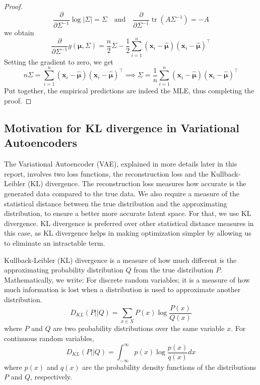 \begin{proof}
    \[
    \frac{\partial}{\partial \Sigma^{-1}} \log |\Sigma| = \Sigma
    \quad \text{and} \quad
    \frac{\partial}{\partial \Sigma^{-1}} \operatorname{tr}(A\Sigma^{-1}) = -A
    \]
    we obtain
    \[
    \frac{\partial}{\partial \Sigma^{-1}} g(\boldsymbol{\mu},\Sigma) = \frac{n}{2}\Sigma - \frac{1}{2}\sum_{i=1}^n (\mathbf{x}_i - \hat{\boldsymbol{\mu}})(\mathbf{x}_i - \hat{\boldsymbol{\mu}})^\top
    \]
    Setting the gradient to zero, we get
    \[
    n\Sigma = \sum_{i=1}^n (\mathbf{x}_i - \hat{\boldsymbol{\mu}})(\mathbf{x}_i - \hat{\boldsymbol{\mu}})^\top
    \implies
    \Sigma = \frac{1}{n} \sum_{i=1}^n (\mathbf{x}_i - \hat{\boldsymbol{\mu}})(\mathbf{x}_i - \hat{\boldsymbol{\mu}})^\top
    \]
    Put together, the empirical predictions are indeed the MLE, thus completing the proof.
\end{proof}

\subsection{Motivation for KL divergence in Variational Autoencoders}
The Variational Autoencoder (VAE), explained in more details later in this report, involves two loss functions, the reconstruction loss and the Kullback-Leibler (KL) divergence. The reconstruction loss measures how accurate is the generated data compared to the true data. We also require a measure of the statistical distance between the true distribution and the approximating distribution, to ensure a better more accurate latent space. For that, we use KL divergence.
KL divergence is preferred over other statistical distance measures in this case, as KL divergence helps in making optimization simpler by allowing us to eliminate an intractable term.
\begin{definition}
Kullback-Leibler (KL) divergence is a measure of how much different is the approximating probability distribution \( Q \) from the true distribution \( P \). Mathematically, we write: 
For discrete random variables; it is a measure of how much information is lost when a distribution is used to approximate another distribution.
\begin{equation}
D_{KL}(P || Q) = \sum_{x \in X} P(x) \log \frac{P(x)}{Q(x)}
\end{equation}
where \( P \) and \( Q \) are two probability distributions over the same variable \( x \). \newline
For continuous random variables, 
\begin{equation}
D_{KL}(P || Q) = \int_{-\infty}^{\infty} p(x) \log \frac{p(x)}{q(x)} dx
\end{equation}
where \( p(x) \) and \( q(x) \) are the probability density functions of the distributions \( P \) and \( Q \), respectively.
\end{definition}
